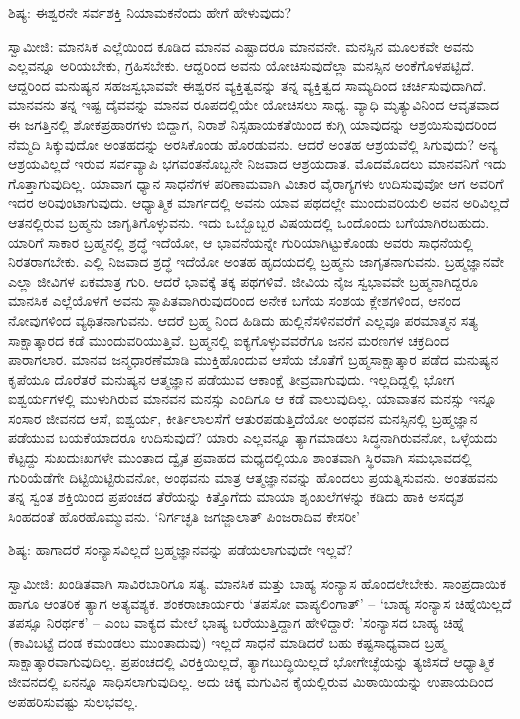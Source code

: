 ಶಿಷ್ಯ: ಈಶ್ವರನೇ ಸರ್ವಶಕ್ತಿ ನಿಯಾಮಕನೆಂದು ಹೇಗೆ ಹೇಳುವುದು?

ಸ್ವಾಮೀಜಿ: ಮಾನಸಿಕ ಎಲ್ಲೆಯಿಂದ ಕೂಡಿದ ಮಾನವ ಎಷ್ಟಾದರೂ ಮಾನವನೇ. ಮನಸ್ಸಿನ ಮೂಲಕವೇ ಅವನು ಎಲ್ಲವನ್ನೂ ಅರಿಯಬೇಕು, ಗ್ರಹಿಸಬೇಕು. ಆದ್ದರಿಂದ ಅವನು ಯೋಚಿಸುವುದೆಲ್ಲಾ ಮನಸ್ಸಿನ ಅಂಕೆಗೊಳಪಟ್ಟಿದೆ. ಆದ್ದರಿಂದ ಮನುಷ್ಯನ ಸಹಜಸ್ವಭಾವವೇ ಈಶ್ವರನ ವ್ಯಕ್ತಿತ್ವವನ್ನು ತನ್ನ ವ್ಯಕ್ತಿತ್ವದ ಸಾಮ್ಯದಿಂದ ಚರ್ಚಿಸುವುದಾಗಿದೆ. ಮಾನವನು ತನ್ನ ಇಷ್ಟ ದೈವವನ್ನು ಮಾನವ ರೂಪದಲ್ಲಿಯೇ ಯೋಚಿಸಲು ಸಾಧ್ಯ. ವ್ಯಾಧಿ ಮೃತ್ಯುವಿನಿಂದ ಆವೃತವಾದ ಈ ಜಗತ್ತಿನಲ್ಲಿ ಶೋಕಪ್ರಹಾರಗಳು ಬಿದ್ದಾಗ, ನಿರಾಶೆ ನಿಸ್ಸಹಾಯಕತೆಯಿಂದ ಕುಗ್ಗಿ ಯಾವುದನ್ನು ಆಶ್ರಯಿಸುವುದರಿಂದ ನೆಮ್ಮದಿ ಸಿಕ್ಕುವುದೋ ಅಂತಹದನ್ನು ಅರಸಿಕೊಂಡು ಹೊರಡುವನು. ಆದರೆ ಅಂತಹ ಆಶ್ರಯವೆಲ್ಲಿ ಸಿಗುವುದು? ಅನ್ಯ ಆಶ್ರಯವಿಲ್ಲದೆ ಇರುವ ಸರ್ವವ್ಯಾಪಿ ಭಗವಂತನೊಬ್ಬನೇ ನಿಜವಾದ ಆಶ್ರಯದಾತ. ಮೊದಮೊದಲು ಮಾನವನಿಗೆ ಇದು ಗೊತ್ತಾಗುವುದಿಲ್ಲ. ಯಾವಾಗ ಧ್ಯಾನ ಸಾಧನೆಗಳ ಪರಿಣಾಮವಾಗಿ ವಿಚಾರ ವೈರಾಗ್ಯಗಳು ಉದಿಸುವುವೋ ಆಗ ಅವರಿಗೆ ಇದರ ಅರಿವುಂಟಾಗುವುದು. ಆಧ್ಯಾತ್ಮಿಕ ಮಾರ್ಗದಲ್ಲಿ ಅವನು ಯಾವ ಪಥದಲ್ಲೇ ಮುಂದುವರಿಯಲಿ ಅವನ ಅರಿವಿಲ್ಲದೆ ಆತನಲ್ಲಿರುವ ಬ್ರಹ್ಮನು ಜಾಗೃತಿಗೊಳ್ಳುವನು. ಇದು ಒಬ್ಬೊಬ್ಬರ ವಿಷಯದಲ್ಲಿ ಒಂದೊಂದು ಬಗೆಯಾಗಿರಬಹುದು. ಯಾರಿಗೆ ಸಾಕಾರ ಬ್ರಹ್ಮನಲ್ಲಿ ಶ್ರದ್ಧೆ ಇದೆಯೋ, ಆ ಭಾವನೆಯನ್ನೇ ಗುರಿಯಾಗಿಟ್ಟುಕೊಂಡು ಅವರು ಸಾಧನೆಯಲ್ಲಿ ನಿರತರಾಗಬೇಕು. ಎಲ್ಲಿ ನಿಜವಾದ ಶ್ರದ್ಧೆ ಇದೆಯೋ ಅಂತಹ ಹೃದಯದಲ್ಲಿ ಬ್ರಹ್ಮನು ಜಾಗೃತನಾಗುವನು. ಬ್ರಹ್ಮಜ್ಞಾನವೇ ಎಲ್ಲಾ ಜೀವಿಗಳ ಏಕಮಾತ್ರ ಗುರಿ. ಆದರೆ ಭಾವಕ್ಕೆ ತಕ್ಕ ಪಥಗಳಿವೆ. ಜೀವಿಯ ನೈಜ ಸ್ವಭಾವವೇ ಬ್ರಹ್ಮನಾಗಿದ್ದರೂ ಮಾನಸಿಕ ಎಲ್ಲೆಯೊಳಗೆ ಅವನು ಸ್ಥಾಪಿತವಾಗಿರುವುದರಿಂದ ಅನೇಕ ಬಗೆಯ ಸಂಶಯ ಕ್ಲೇಶಗಳಿಂದ, ಆನಂದ ನೋವುಗಳಿಂದ ವ್ಯಥಿತನಾಗುವನು. ಆದರೆ ಬ್ರಹ್ಮ ನಿಂದ ಹಿಡಿದು ಹುಲ್ಲಿನೆಸಳಿನವರೆಗೆ ಎಲ್ಲವೂ ಪರಮಾತ್ಮನ ಸತ್ಯ ಸಾಕ್ಷಾತ್ಕಾರದ ಕಡೆ ಮುಂದುವರಿಯುತ್ತಿವೆ. ಬ್ರಹ್ಮನಲ್ಲಿ ಐಕ್ಯಗೊಳ್ಳುವವರೆಗೂ ಜನನ ಮರಣಗಳ ಚಕ್ರದಿಂದ ಪಾರಾಗಲಾರ. ಮಾನವ ಜನ್ಮಧಾರಣೆಮಾಡಿ ಮುಕ್ತಿಹೊಂದುವ ಆಸೆಯ ಜೊತೆಗೆ ಬ್ರಹ್ಮಸಾಕ್ಷಾತ್ಕಾರ ಪಡೆದ ಮನುಷ್ಯನ ಕೃಪೆಯೂ ದೊರೆತರೆ ಮನುಷ್ಯನ ಆತ್ಮಜ್ಞಾನ ಪಡೆಯುವ ಆಕಾಂಕ್ಷೆ ತೀವ್ರವಾಗುವುದು. ಇಲ್ಲದಿದ್ದಲ್ಲಿ ಭೋಗ ಐಶ್ವರ್ಯಗಳಲ್ಲಿ ಮುಳುಗಿರುವ ಮಾನವನ ಮನಸ್ಸು ಎಂದಿಗೂ ಆ ಕಡೆ ವಾಲುವುದಿಲ್ಲ. ಯಾವಾತನ ಮನಸ್ಸು ಇನ್ನೂ ಸಂಸಾರ ಜೀವನದ ಆಸೆ, ಐಶ್ವರ್ಯ, ಕೀರ್ತಿಲಾಲಸೆಗೆ ಆತುರಪಡುತ್ತಿದೆಯೋ ಅಂಥವನ ಮನಸ್ಸಿನಲ್ಲಿ ಬ್ರಹ್ಮಜ್ಞಾನ ಪಡೆಯುವ ಬಯಕೆಯಾದರೂ ಉದಿಸುವುದೆ? ಯಾರು ಎಲ್ಲವನ್ನೂ ತ್ಯಾಗಮಾಡಲು ಸಿದ್ಧನಾಗಿರುವನೋ, ಒಳ್ಳೆಯದು ಕೆಟ್ಟದ್ದು ಸುಖದುಃಖಗಳೇ ಮುಂತಾದ ದ್ವೈತ ಪ್ರವಾಹದ ಮಧ್ಯದಲ್ಲಿಯೂ ಶಾಂತವಾಗಿ ಸ್ಥಿರವಾಗಿ ಸಮಭಾವದಲ್ಲಿ ಗುರಿಯೆಡೆಗೇ ದಿಟ್ಟಿಯಿಟ್ಟಿರುವನೋ, ಅಂಥವನು ಮಾತ್ರ ಆತ್ಮಜ್ಞಾನವನ್ನು ಹೊಂದಲು ಪ್ರಯತ್ನಿಸುವನು. ಅಂತಹವನು ತನ್ನ ಸ್ವಂತ ಶಕ್ತಿಯಿಂದ ಪ್ರಪಂಚದ ತೆರೆಯನ್ನು ಕಿತ್ತೊಗೆದು ಮಾಯಾ ಶೃಂಖಲೆಗಳನ್ನು ಕಡಿದು ಹಾಕಿ ಅಸದೃಶ ಸಿಂಹದಂತೆ ಹೊರಹೊಮ್ಮುವನು. ‘ನಿರ್ಗಚ್ಛತಿ ಜಗಜ್ಜಾಲಾತ್ ಪಿಂಜರಾದಿವ ಕೇಸರೀ’

ಶಿಷ್ಯ: ಹಾಗಾದರೆ ಸಂನ್ಯಾಸವಿಲ್ಲದೆ ಬ್ರಹ್ಮಜ್ಞಾನವನ್ನು ಪಡೆಯಲಾಗುವುದೇ ಇಲ್ಲವೆ?

ಸ್ವಾಮೀಜಿ: ಖಂಡಿತವಾಗಿ ಸಾವಿರಬಾರಿಗೂ ಸತ್ಯ. ಮಾನಸಿಕ ಮತ್ತು ಬಾಹ್ಯ ಸಂನ್ಯಾಸ ಹೊಂದಲೇಬೇಕು. ಸಾಂಪ್ರದಾಯಿಕ ಹಾಗೂ ಆಂತರಿಕ ತ್ಯಾಗ ಅತ್ಯವಶ್ಯಕ. ಶಂಕರಾಚಾರ್ಯರು ‘ತಪಸೋ ವಾಪ್ಯಲಿಂಗಾತ್’ – ‘ಬಾಹ್ಯ ಸಂನ್ಯಾಸ ಚಿಹ್ನೆಯಿಲ್ಲದೆ ತಪಸ್ಸೂ ನಿರರ್ಥಕ’ – ಎಂಬ ವಾಕ್ಯದ ಮೇಲೆ ಭಾಷ್ಯ ಬರೆಯುತ್ತಿದ್ದಾಗ ಹೇಳಿದ್ದಾರೆ: 'ಸಂನ್ಯಾಸದ ಬಾಹ್ಯ ಚಿಹ್ನೆ (ಕಾವಿಬಟ್ಟೆ ದಂಡ ಕಮಂಡಲು ಮುಂತಾದುವು) ಇಲ್ಲದೆ ಸಾಧನೆ ಮಾಡಿದರೆ ಬಹು ಕಷ್ಟಸಾಧ್ಯವಾದ ಬ್ರಹ್ಮ ಸಾಕ್ಷಾತ್ಕಾರವಾಗುವುದಿಲ್ಲ. ಪ್ರಪಂಚದಲ್ಲಿ ವಿರಕ್ತಿಯಿಲ್ಲದೆ, ತ್ಯಾಗಬುದ್ಧಿಯಿಲ್ಲದೆ ಭೋಗೇಚ್ಛೆಯನ್ನು ತ್ಯಜಿಸದೆ ಆಧ್ಯಾತ್ಮಿಕ ಜೀವನದಲ್ಲಿ ಏನನ್ನೂ ಸಾಧಿಸಲಾಗುವುದಿಲ್ಲ. ಅದು ಚಿಕ್ಕ ಮಗುವಿನ ಕೈಯಲ್ಲಿರುವ ಮಿಠಾಯಿಯನ್ನು ಉಪಾಯದಿಂದ ಅಪಹರಿಸುವಷ್ಟು ಸುಲಭವಲ್ಲ.

